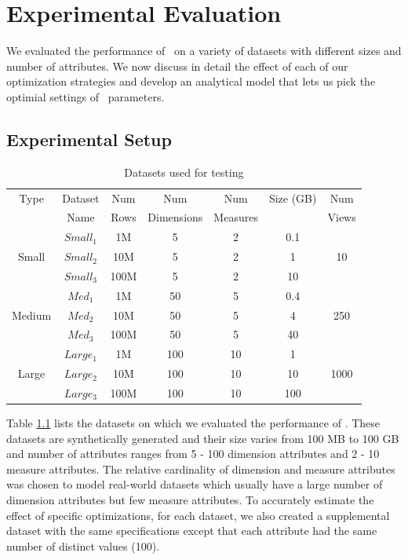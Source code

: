 \chapter{Experimental Evaluation}

We evaluated the performance of \SeeDB\ on a variety of datasets with different
sizes and number of attributes. We now discuss in detail the effect of
each of our optimization strategies and develop an analytical model that lets us
pick the optimial settings of \SeeDB\ parameters.

\section{Experimental Setup}

\begin{table}[htb]
  \centering
  \begin{tabular}{|c|c|c|c|c|c|c|} \hline
  Type & Dataset & Num  & Num  & Num  & Size (GB) &
  Num \\
  & Name & Rows & Dimensions &  Measures & & Views \\ \hline 
   & $Small_1$ & 1M & 5 & 2 &  0.1 & \\ 
  Small & $Small_2$ & 10M & 5 & 2 &  1 & 10\\ 
   & $Small_3$ & 100M & 5 & 2 &  10 & \\ \hline
   & $Med_1$ & 1M & 50 & 5 &  0.4 & \\
  Medium & $Med_2$ & 10M & 50 & 5 &  4 & 250\\ 
   & $Med_3$ & 100M & 50 & 5 &  40 & \\ \hline
   & $Large_1$ & 1M & 100 & 10 &  1 & \\
  Large & $Large_2$ & 10M & 100 & 10 &  10 & 1000\\
   & $Large_3$ & 100M & 100 & 10 &  100 & \\ \hline
  \end{tabular}
  \caption{Datasets used for testing}
  \label{tab:datasets} 
\end{table}

Table \ref{tab:datasets} lists the datasets on which we evaluated the
performance of \SeeDB. These datasets are synthetically generated and their size
varies from 100 MB to 100 GB and number of attributes ranges from 5 - 100 dimension attributes and 2 -
 10 measure attributes. The relative cardinality of dimension and measure attributes
was chosen to model real-world datasets which usually have a large number of
dimension attributes but few measure attributes. To accurately estimate the
effect of specific optimizations, for each dataset, we also created a
supplemental dataset with the same specifications except that each attribute had
the same number of distinct values (100).


